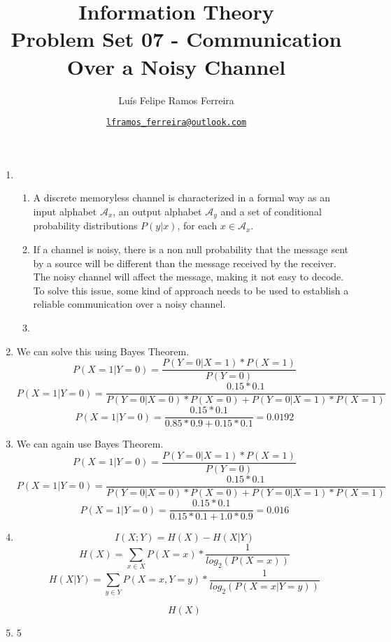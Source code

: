 \documentclass{article}
\title{Information Theory \\ \large Problem Set 07 - Communication Over a Noisy Channel}
\author{Luís Felipe Ramos Ferreira}
\date{\href{mailto:lframos\_ferreira@outlook.com}{\texttt{lframos\_ferreira@outlook.com}}
}
\begin{document}
\maketitle

\begin{enumerate}
    \item  \begin{enumerate}
            \item A discrete memoryless channel is characterized in a formal way as an input alphabet \(\mathcal{A}_x\), an output alphabet \(\mathcal{A}_y\) and a set of conditional probability distributions \(P(y | x)\), for each \(x \in \mathcal{A}_x\).
            \item If a channel is noisy, there is a non null probability that the message sent by a source will be different than the message received by the receiver. The noisy channel will affect the message, making it not easy to decode. To solve this issue, some kind of approach needs to be used to establish a reliable communication over a noisy channel.
            \item 
        \end{enumerate}
    \item We can solve this using Bayes Theorem.
        \[P(X = 1 | Y = 0) = \frac{P(Y = 0 | X = 1) * P(X = 1)}{P(Y = 0)}\]
        \[P(X = 1 | Y = 0) = \frac{0.15 * 0.1}{P(Y = 0 | X = 0)* P(X = 0) + P(Y = 0 | X = 1) * P(X = 1)}\]
        \[P(X = 1 | Y = 0) = \frac{0.15 * 0.1}{0.85 * 0.9 + 0.15 * 0.1} = 0.0192\]
    \item We can again use Bayes Theorem.
        \[P(X = 1 | Y = 0) = \frac{P(Y = 0 | X = 1) * P(X = 1)}{P(Y = 0)}\]
        \[P(X = 1 | Y = 0) = \frac{0.15 * 0.1}{P(Y = 0 | X = 0)* P(X = 0) + P(Y = 0 | X = 1) * P(X = 1)}\]
        \[P(X = 1 | Y = 0) = \frac{0.15 * 0.1}{0.15 * 0.1 + 1.0 * 0.9} = 0.016\]
    \item 
        \[I(X; Y) = H(X) - H(X | Y)\]
        \[H(X) = \sum_{x \in X} P(X = x) * \frac{1}{log_2(P(X = x))}\]
        \[H(X | Y) = \sum_{y \in Y} P(X = x, Y = y) * \frac{1}{log_2(P(X = x | Y = y))}\]

        \[H(X)\]
    \item 5

\end{enumerate}


\nocite{*}
\end{document}
